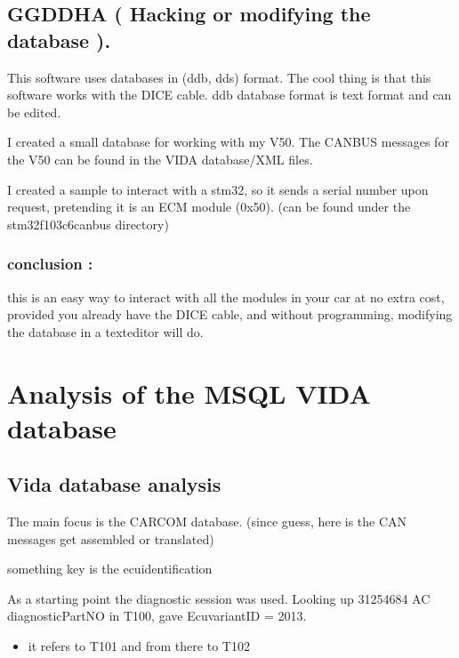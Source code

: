 \documentclass[letterpaper,10pt,english]{sphinxmanual}
\begin{document}
\section{GGD\sphinxhyphen{}DHA (  Hacking \sphinxhyphen{} or modifying the database ).}
\label{\detokenize{software/DHA-hack:ggd-dha-hacking-or-modifying-the-database}}\label{\detokenize{software/DHA-hack::doc}}
\sphinxAtStartPar
This software uses databases in (ddb, dds) format.
The cool thing is that this software works with the DICE cable.
ddb database format is text format and can be edited.

\sphinxAtStartPar
I created a small database for working with my V50.
The CANBUS messages for the V50 can be found in the VIDA database/XML files.

\sphinxAtStartPar
I created a sample to interact with a stm32, so it sends a serial number upon request, pretending it is an ECM module (0x50).
(can be found under the stm32f103c6\sphinxhyphen{}canbus directory)


\subsection{conclusion :}
\label{\detokenize{software/DHA-hack:conclusion}}
\sphinxAtStartPar
this is an easy way to interact with all the modules in your car at no extra cost, provided you already have the DICE cable, and without programming, modifying the database in a texteditor will do.

\noindent{}


\chapter{Analysis of the MSQL VIDA database}
\label{\detokenize{vidadatabase/index:analysis-of-the-msql-vida-database}}\label{\detokenize{vidadatabase/index::doc}}

\section{Vida database analysis}
\label{\detokenize{vidadatabase/ecuvariant:vida-database-analysis}}\label{\detokenize{vidadatabase/ecuvariant::doc}}
\sphinxAtStartPar
The main focus is the CARCOM database. (since guess, here is the CAN messages get assembled or translated)

\sphinxAtStartPar
something key is the ecu\sphinxhyphen{}identification

\sphinxAtStartPar
As a starting point the diagnostic session was used.
Looking up 31254684 AC diagnosticPartNO in T100, gave EcuvariantID = 2013.
\begin{itemize}
\item {} 
\sphinxAtStartPar
it refers to T101 and from there to T102

\end{itemize}
\end{document}
